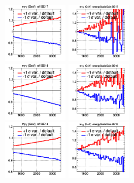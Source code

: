 \begin{figure}[!htbp]
\includegraphics[width=0.24\linewidth, height=1in]{fig/spectra__eff_BE17_ADDGRW.png}
\includegraphics[width=0.24\linewidth, height=1in]{fig/spectra__energyScaleGain_BE17_ADDGRW.png}\\
\includegraphics[width=0.24\linewidth, height=1in]{fig/spectra__eff_BB18_ADDGRW.png}
\includegraphics[width=0.24\linewidth, height=1in]{fig/spectra__energyScaleGain_BB18_ADDGRW.png}\\
\includegraphics[width=0.24\linewidth, height=1in]{fig/spectra__eff_BE18_ADDGRW.png}
\includegraphics[width=0.24\linewidth, height=1in]{fig/spectra__energyScaleGain_BE18_ADDGRW.png}
\label{fig:E_scale_sys}
\end{figure}







\newpage
% 
% 
